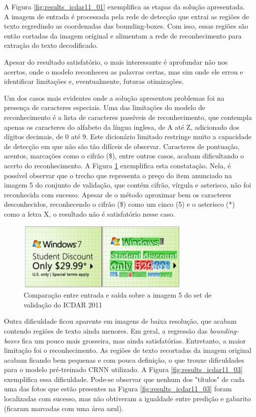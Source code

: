 A Figura \ref{fig:results_icdar11_01} exemplifica as etapas da solução apresentada. A imagem de entrada é processada pela rede de detecção que extrai as regiões de texto regredindo as coordenadas das bounding-boxes. Com isso, essas regiões são então cortadas da imagem original e alimentam a rede de reconhecimento para extração do texto decodificado.

Apesar do resultado satisfatório, o mais interessante é aprofundar não nos acertos, onde o modelo reconheceu as palavras certas, mas sim onde ele errou e identificar limitações e, eventualmente, futuras otimizações.

Um dos casos mais evidentes onde a solução apresentou problemas foi na presença de caracteres especiais. Uma das limitações do modelo de reconhecimento é a lista de caracteres passíveis de reconhecimento, que contempla apenas os caracteres do alfabeto da língua inglesa, de A até Z, adicionado dos dígitos decimais, de 0 até 9. Este dicionário limitado restringe muito a capacidade de detecção em que não são tão difíceis de observar. Caracteres de pontuação, acentos, marcações como o cifrão (\$), entre outros casos, acabam dificultando o acerto do reconhecimento. A Figura \ref{fig:results_icdar11_02} exemplifica esta constatação. Nela, é possível observar que o trecho que representa o preço do item anunciado na imagem 5 do conjunto de validação, que contém cifrão, vírgula e asterisco, não foi reconhecida com sucesso. Apesar de o método aproximar bem os caracteres desconhecidos, reconhecendo o cifrão (\$) como um cinco (5) e o asterisco (*) como a letra X, o resultado não é satisfatório nesse caso.

\begin{figure}
    \centering
    \includegraphics[width=0.75\textwidth]{figs/resultados-icdar11-02.png}
    \caption{Comparação entre entrada e saída sobre a imagem 5 do set de validação do ICDAR 2011}
    \label{fig:results_icdar11_02}
\end{figure}

Outra dificuldade ficou aparente em imagens de baixa resolução, que acabam contendo regiões de texto ainda menores. Em geral, a regressão das \textit{bounding-boxes} fica um pouco mais grosseira, mas ainda satisfatórias. Entretanto, a maior limitação foi o reconhecimento. As regiões de texto recortadas da imagem original acabam ficando bem pequenas e com pouca definição, o que trouxe dificuldades para o modelo pré-treinado CRNN utilizado. A Figura \ref{fig:results_icdar11_03} exemplifica essa dificuldade. Pode-se observar que nenhum dos "títulos" de cada uma das fotos que estão presentes na Figura \ref{fig:results_icdar11_03} foram localizadas com sucesso, mas não obtiveram a igualdade entre predição e gabarito (ficaram marcadas com uma área azul).


